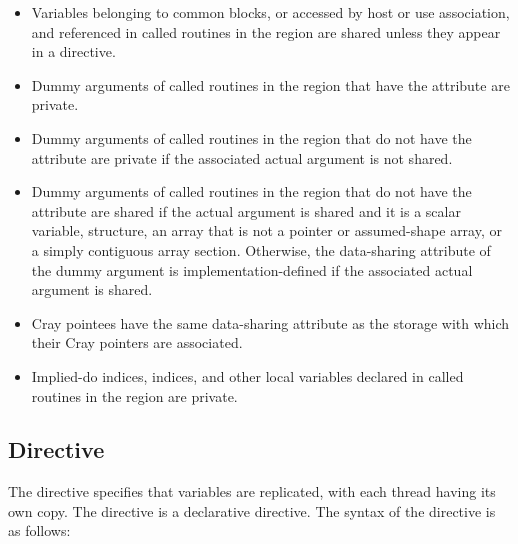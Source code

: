 {{{{\begin{itemize}
\item Variables belonging to common blocks, or accessed by host or use association, and referenced in called routines in the region are shared unless they appear in a  directive. 

\item Dummy arguments of called routines in the region that have the
     attribute are private.

\item Dummy arguments of called routines in the region that do not have the
     attribute are private if the associated actual argument is not
    shared.

\item Dummy arguments of called routines in the region that do not have the
 attribute are shared if the actual argument is shared and it
is a scalar variable, structure, an array that is not a pointer or
assumed-shape array, or a simply contiguous array section.  Otherwise, the
data-sharing attribute of the dummy argument is implementation-defined if
the associated actual argument is shared.

\item Cray pointees have the same data-sharing attribute as the storage with which their Cray pointers are associated.

\item Implied-do indices,  indices, and other local variables declared in called 
routines in the region are private. 

\end{itemize}


\fortranspecificend









\subsection{ Directive}
\label{subsec:threadprivate Directive}
\summary
The  directive specifies that variables are replicated, with each thread 
having its own copy. The  directive is a declarative directive.
\syntax
\ccppspecificstart
The syntax of the  directive is as follows:

}}}}
